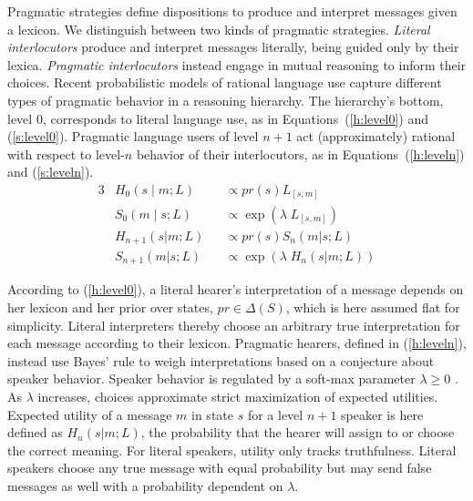 \documentclass[a4paper, 11pt]{article}
\theoremstyle{Satz}
\newcommand{\state}{\ensuremath{s}\xspace}		%
\newcommand{\messg}{\ensuremath{m}\xspace}		%
\begin{document}
Pragmatic strategies define dispositions to produce and interpret messages given a lexicon. We
distinguish between two kinds of pragmatic strategies. {\em Literal interlocutors} produce and
interpret messages literally, being guided only by their lexica. {\em Pragmatic interlocutors}
instead engage in mutual reasoning to inform their choices. Recent probabilistic models of
rational language use
\citep{frank+goodman:2012,FrankeJager2015:Probabilistic-p,GoodmanFrank2016:Pragmatic-Langu}
capture different types of pragmatic behavior in a reasoning hierarchy. The hierarchy's bottom,
level $0$, corresponds to literal language use, as in Equations~(\ref{h:level0}) and
(\ref{s:level0}). Pragmatic language users of level $n + 1$ act (approximately) rational with
respect to level-$n$ behavior of their interlocutors, as in Equations~(\ref{h:leveln}) and
(\ref{s:leveln}).
\begin{alignat}{3}
&H_{0}(s \mid m;L) &&\propto pr(s) L_{[s,m]} \label{h:level0}\\
&S_{0}(m \mid s;L) &&\propto \exp(\lambda \; L_{[s,m]}) \label{s:level0}\\
&H_{n+1}(s|m;L) &&\propto pr(s) S_{n}(m|s;L) \label{h:leveln}\\
&S_{n+1}(m|s;L) &&\propto  \exp(\lambda \; H_{n}(s|m;L)) \label{s:leveln}
\end{alignat}

According to (\ref{h:level0}), a literal hearer's interpretation of a message depends on her
lexicon and her prior over states, $pr \in \Delta(S)$, which is here assumed flat for
simplicity. Literal interpreters thereby choose an arbitrary true interpretation for each
message according to their lexicon. Pragmatic hearers, defined in (\ref{h:leveln}), instead use Bayes' rule to weigh
interpretations based on a conjecture about speaker behavior. Speaker behavior is regulated by
a soft-max parameter $\lambda \geq 0$ \citep{luce:1959,sutton+barto:1998}. As
$\lambda$ increases, choices approximate strict maximization of expected utilities. Expected
utility of a message $\messg$ in state $\state$ for a level $n+1$ speaker is here defined as
$H_{n}(s|m;L)$, the probability that the hearer will assign to or choose the correct
meaning. For literal speakers, utility only tracks truthfulness. Literal speakers choose any
true message with equal probability but may send false messages as well with a probability
dependent on $\lambda$.
\end{document}
